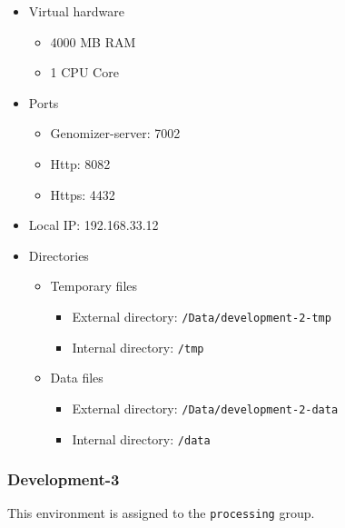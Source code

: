 \begin{itemize}
\itemsep1pt\parskip0pt
\item
  Virtual hardware

  \begin{itemize}
  \itemsep1pt\parskip0pt
  \item
    4000 MB RAM
  \item
    1 CPU Core
  \end{itemize}
\item
  Ports

  \begin{itemize}
  \itemsep1pt\parskip0pt
  \item
    Genomizer-server: 7002
  \item
    Http: 8082
  \item
    Https: 4432
  \end{itemize}
\item
  Local IP: 192.168.33.12
\item
  Directories

  \begin{itemize}
  \itemsep1pt\parskip0pt
  \item
    Temporary files

    \begin{itemize}
    \itemsep1pt\parskip0pt
    \item
      External directory: \texttt{/Data/development-2-tmp}
    \item
      Internal directory: \texttt{/tmp}
    \end{itemize}
  \item
    Data files

    \begin{itemize}
    \itemsep1pt\parskip0pt
    \item
      External directory: \texttt{/Data/development-2-data}
    \item
      Internal directory: \texttt{/data}
    \end{itemize}
  \end{itemize}
\end{itemize}

\subsubsection{Development-3}\label{development-3}

This environment is assigned to the \texttt{processing} group.

